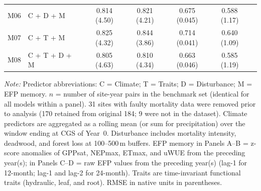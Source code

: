 \begin{table}[htbp]
\begin{tabular}{llcccccc}
M06 & C + D + M           &                      & 0.814 (4.50) & 0.821 (4.21) & 0.675 (0.045) & 0.588 (1.17) \\
M07 & C + T + M           &                      & 0.825 (4.32) & 0.844 (3.86) & 0.714 (0.041) & 0.640 (1.09) \\
M08 & C + T + D + M       &                      & 0.805 (4.63) & 0.810 (4.34) & 0.663 (0.046) & 0.585 (1.19) \\
\bottomrule
\end{tabular}
\vspace{2pt}
\begin{minipage}{\linewidth}
\footnotesize
\textit{Note:} Predictor abbreviations: C = Climate; T = Traits; D = Disturbance;
M = EFP memory. $n$ = number of site-year pairs in the benchmark set (identical
for all models within a panel). 31 sites with faulty mortality data were removed
prior to analysis (170 retained from original 184; 9 were not in the dataset).
Climate predictors are aggregated as a rolling mean (or sum for precipitation)
over the window ending at CGS of Year~0. Disturbance includes mortality
intensity, deadwood, and forest loss at 100--500\,m buffers. EFP memory in
Panels A--B = z-score anomalies of GPPsat, NEPmax, ETmax, and uWUE from the
preceding year(s); in Panels C--D = raw EFP values from the preceding year(s)
(lag-1 for 12-month; lag-1 and lag-2 for 24-month). Traits are time-invariant
functional traits (hydraulic, leaf, and root). RMSE in native units in
parentheses.
\end{minipage}
\end{table}
